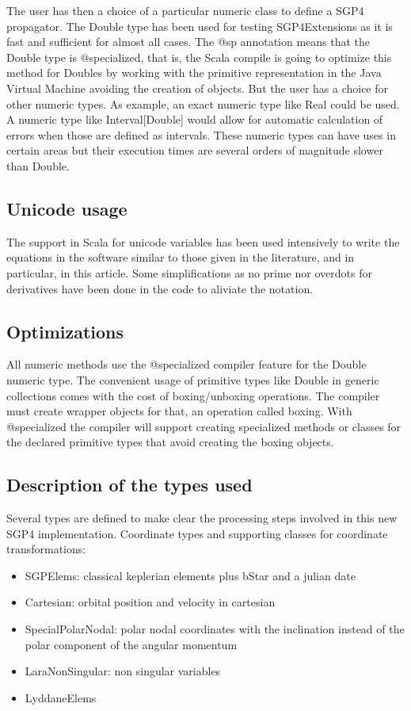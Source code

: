 \documentclass{article}
\begin{document}
The user has then a choice of a particular numeric class to define a SGP4 propagator.
The Double type has been used for testing SGP4Extensions
as it is fast and sufficient for almost all cases. The @sp annotation means that the Double type
is @specialized, that is, the Scala compile is going to optimize this method for Doubles by
working with the primitive representation in the Java Virtual Machine avoiding the creation
of objects. But the user has a choice for other numeric types. As example, an exact numeric type like Real
could be used. A numeric type like Interval[Double] would allow for automatic calculation of errors
when those are defined as intervals. These numeric types can have uses in certain areas
but their execution times are several orders of magnitude slower than Double.

\subsection{Unicode usage}
\label{sec:unicodeusage}

The support in Scala for unicode variables has been used intensively to write
the equations in the software similar to those given in the literature, and in particular,
in this article. Some simplifications as no prime nor overdots for derivatives
have been done in the code to aliviate the notation.

\subsection{Optimizations}
\label{sec:optimizations}

All numeric methods use the @specialized compiler feature for the Double numeric type.
The convenient usage of primitive types like Double in generic collections comes with
the cost of boxing/unboxing operations. The compiler
must create wrapper objects for that, an operation called boxing. With @specialized
the compiler will support creating specialized methods or classes for the
declared primitive types that avoid creating the boxing objects.

\subsection{Description of the types used}
\label{sec:typesystem}

Several types are defined to make clear the processing steps involved in this new SGP4 implementation.
Coordinate types and supporting classes for coordinate transformations:
\begin{itemize}
\item SGPElems: classical keplerian elements plus bStar and a julian date
\item Cartesian: orbital position and velocity in cartesian
\item SpecialPolarNodal: polar nodal coordinates with the inclination instead of the polar component of the angular momentum
\item LaraNonSingular: non singular variables
\item LyddaneElems
\end{itemize}
\end{document}
